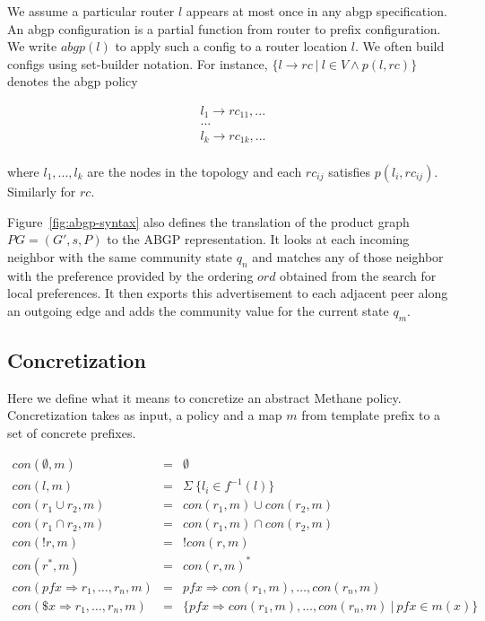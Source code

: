 \documentclass[twocolumn]{sig-alternate-10pt}
\newcommand{\sysname}{{\small \sf Methane}\xspace}
\begin{document}
We assume a particular router $l$ appears at most once in any abgp specification.
An abgp configuration is a partial function from router to prefix configuration.
We write $abgp(l)$ to apply such a config to a router location $l$.
%
We often build configs using set-builder notation.  For instance,
$\{l \rightarrow rc ~\vert~ l \in V \wedge p(l,rc)\}$ denotes the abgp policy

\[ \begin{array}{c}
  l_1 \rightarrow rc_{11},... \\
  ...           \\
  l_k \rightarrow rc_{1k},... \\
\end{array} \]


where $l_1, ..., l_k$ are the nodes in the topology
and each $rc_{ij}$ satisfies $p(l_i,rc_{ij})$. Similarly for $rc$.

Figure~\ref{fig:abgp-syntax} also defines the translation of the product graph $PG = (G', s, P)$ to the ABGP representation. It looks at each incoming neighbor with the same community state $q_n$ and matches any of those neighbor with the preference provided by the ordering $ord$ obtained from the search for local preferences. It then exports this advertisement to each adjacent peer along an outgoing edge and adds the community value for the current state $q_m$.


\subsection{Concretization}

Here we define what it means to concretize an abstract \sysname policy. 
Concretization takes as input, a policy and a map $m$ from template prefix to a set of concrete prefixes.

\[ \begin{array}{rcl}
  con(\emptyset,m)                        & = & \emptyset \\
  con(l,m)                                & = & \Sigma ~ \{ l_i \in f^{-1}(l) \} \\
  con(r_1 \cup r_2,m)                     & = & con(r_1,m) \cup con(r_2,m) \\
  con(r_1 \cap r_2,m)                     & = & con(r_1,m) \cap con(r_2,m) \\
  con(!r,m)                               & = & !con(r,m) \\
  con(r^*,m)                              & = & con(r,m)^* \\
  con(pfx \Rightarrow r_1, \dots, r_n,m)  & = & pfx \Rightarrow con(r_1,m), \dots, con(r_n,m) \\
  con(\$x \Rightarrow r_1, \dots, r_n,m)  & = & \{ pfx \Rightarrow con(r_1,m), \dots, con(r_n,m) ~\vert~ {pfx} \in m(x) \} \\
\end{array} \]
\end{document}
